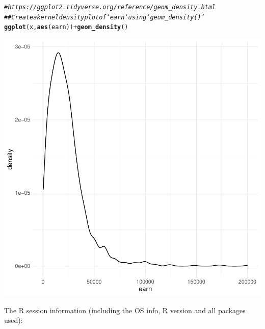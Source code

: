 \documentclass{article}\usepackage[]{graphicx}\usepackage[]{xcolor}
\makeatletter
\newcommand{\hlcom}[1]{\textcolor[rgb]{0.678,0.584,0.686}{\textit{#1}}}%
\newcommand{\hlopt}[1]{\textcolor[rgb]{0,0,0}{#1}}%
\newcommand{\hlstd}[1]{\textcolor[rgb]{0.345,0.345,0.345}{#1}}%
\newcommand{\hlkwd}[1]{\textcolor[rgb]{0.737,0.353,0.396}{\textbf{#1}}}%
\newenvironment{kframe}{%
 \def\at@end@of@kframe{}%
 \ifinner\ifhmode%
  \def\at@end@of@kframe{\end{minipage}}%
  \begin{minipage}{\columnwidth}%
 \fi\fi%
 \def\FrameCommand##1{\hskip\@totalleftmargin \hskip-\fboxsep
 \colorbox{shadecolor}{##1}\hskip-\fboxsep
     \hskip-\linewidth \hskip-\@totalleftmargin \hskip\columnwidth}%
 \MakeFramed {\advance\hsize-\width
   \@totalleftmargin\z@ \linewidth\hsize
   \@setminipage}}%
 {\par\unskip\endMakeFramed%
 \at@end@of@kframe}
\newenvironment{knitrout}{}{} %
\makeatother
\begin{document}
\begin{knitrout}
{}


\begin{kframe}\begin{alltt}
\hlcom{# https://ggplot2.tidyverse.org/reference/geom_density.html}
\hlcom{## Create a kernel density plot of `earn` using `geom_density()`}
\hlkwd{ggplot}\hlstd{(x,} \hlkwd{aes}\hlstd{(earn))} \hlopt{+}  \hlkwd{geom_density}\hlstd{()}
\end{alltt}
\end{kframe}

{\centering \includegraphics[width=.6\linewidth]{figure/assignment-03-SyversonLuke-Rnwauto-report-11} 

}


\end{knitrout}

The R session information (including the OS info, R version and all
packages used):
\end{document}
